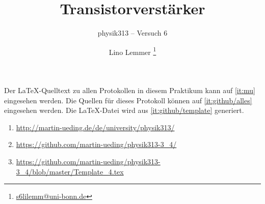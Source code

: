 


\usepackage{placeins}



\subject{Praktikumsprotokoll}
\title{Transistorverstärker}
\subtitle{physik313 – Versuch 6}
\author{
    Lino Lemmer \footnote{\href{mailto:s6lilemm@uni-bonn.de}{s6lilemm@uni-bonn.de}}
}


\newcommand\IB{I_\text{B}}
\newcommand\IC{I_\text{C}}
\newcommand\ID{I_\text{D}}
\newcommand\IE{I_\text{E}}
\newcommand\IS{I_\text{S}}
\newcommand\RC{R_\text{C}}
\newcommand\RE{R_\text{E}}
\newcommand\UBE{U_\text{BE}}
\newcommand\UB{U_\text{B}}
\newcommand\UC{U_\text{C}}
\newcommand\UCE{U_\text{CE}}
\newcommand\UE{U_\text{E}}
\newcommand\UGS{U_\text{GS}}

\usepackage{tocloft}


\newcommand{\FIXME}[1]{\printTODO{FIXME: #1}}
\newcommand{\TODO}[1]{\printTODO{TODO: #1}}
\newcommand{\XXX}[1]{\printTODO{XXX: #1}}
\newcommand{\FRAGE}[1]{\printTODO{Rückfrage: #1}}

\newcommand{\printTODO}[1]{
    \par%
    \textcolor{OrangeRed}{\textsf{#1}}%
    \par%
    \refstepcounter{todo}
    \addcontentsline{lotd}{todo}{#1}
}




\maketitle

Der \LaTeX-Quelltext zu allen Protokollen in diesem Praktikum kann auf
\ref{it:mu} eingesehen werden. Die Quellen für dieses Protokoll können auf
\ref{it:github/alles} eingesehen werden. Die \LaTeX-Datei wird aus
\ref{it:github/template} generiert.

\begin{enumerate}
    \item
        \label{it:mu}
        \url{http://martin-ueding.de/de/university/physik313/}
    \item
        \label{it:github/alles}
        \url{https://github.com/martin-ueding/physik313-3_4/}
    \item
        \label{it:github/template}
        \url{https://github.com/martin-ueding/physik313-3_4/blob/master/Template_4.tex}
\end{enumerate}

